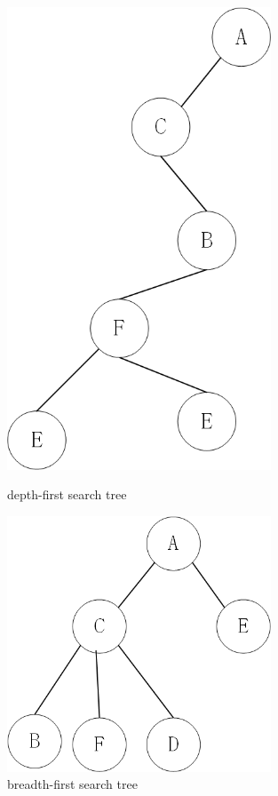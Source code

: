 \documentclass[aps,letterpaper,10pt]{revtex4}
\begin{document}
\begin{figure}
	\begin{minipage}[c]{0.4\textwidth} %
		\centering
		\includegraphics[width=0.7\textwidth]{Q1_visual_DFS_Tree.png} %
		\caption{depth-first search tree}
	\end{minipage}%
	\begin{minipage}[c]{0.4\textwidth} %
		\centering
		\includegraphics[width=0.7\textwidth]{Q1_visual_BFS_Tree.png} %
		\caption{breadth-first search tree}
	\end{minipage}%

\end{figure}
\end{document}
